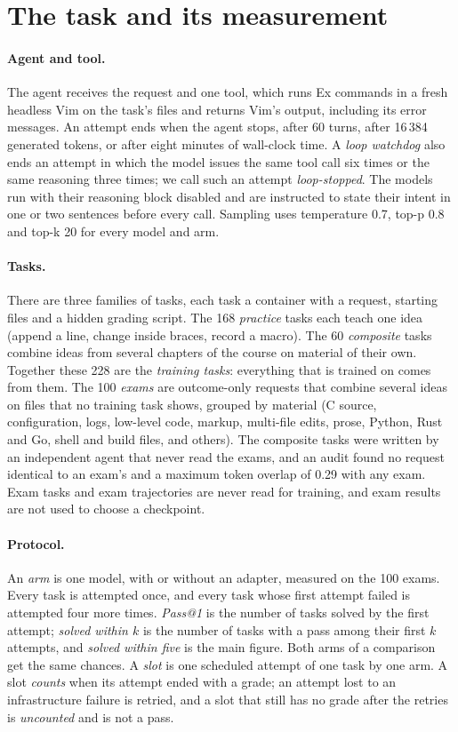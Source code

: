 \section{The task and its measurement}\label{sec:task}
\paragraph{Agent and tool.} The agent receives the request and one tool, which runs Ex commands in a fresh headless
Vim on the task's files and returns Vim's output, including its error messages. An attempt ends when the agent stops,
after 60 turns, after 16\,384 generated tokens, or after eight minutes of wall-clock time. A \emph{loop watchdog} also
ends an attempt in which the model issues the same tool call six times or the same reasoning three times; we call such
an attempt \emph{loop-stopped}. The models run with their reasoning block disabled and are instructed to state their
intent in one or two sentences before every call. Sampling uses temperature 0.7, top-p 0.8 and top-k 20 for every model
and arm.

\paragraph{Tasks.} There are three families of tasks, each task a container with a request, starting files and a hidden
grading script. The 168 \emph{practice} tasks each teach one idea (append a line, change inside braces, record a macro).
The 60 \emph{composite} tasks combine ideas from several chapters of the course on material of their own. Together
these 228 are the \emph{training tasks}: everything that is trained on comes from them. The 100 \emph{exams} are
outcome-only requests that combine several ideas on files that no training task shows, grouped by material (C source,
configuration, logs, low-level code, markup, multi-file edits, prose, Python, Rust and Go, shell and build files, and
others). The composite tasks were written by an independent agent that never read the exams, and an audit found no
request identical to an exam's and a maximum token overlap of 0.29 with any exam. Exam tasks and exam trajectories are
never read for training, and exam results are not used to choose a checkpoint.

\paragraph{Protocol.} An \emph{arm} is one model, with or without an adapter, measured on the 100 exams. Every task is
attempted once, and every task whose first attempt failed is attempted four more times. \emph{Pass@1} is the number of
tasks solved by the first attempt; \emph{solved within $k$} is the number of tasks with a pass among their first $k$
attempts, and \emph{solved within five} is the main figure. Both arms of a comparison get the same chances. A
\emph{slot} is one scheduled attempt of one task by one arm. A slot \emph{counts} when its attempt ended with a grade;
an attempt lost to an infrastructure failure is retried, and a slot that still has no grade after the retries is
\emph{uncounted} and is not a pass.

